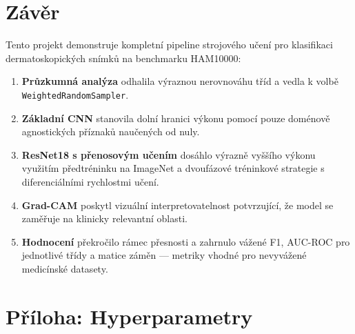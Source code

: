 \documentclass[12pt, a4paper]{article}
\begin{document}
\section{Závěr}
\label{sec:conclusion}

Tento projekt demonstruje kompletní pipeline strojového učení pro
klasifikaci dermatoskopických snímků na benchmarku HAM10000:

\begin{enumerate}
    \item \textbf{Průzkumná analýza} odhalila výraznou nerovnováhu tříd
          a vedla k volbě \texttt{WeightedRandomSampler}.
    \item \textbf{Základní CNN} stanovila dolní hranici výkonu pomocí
          pouze doménově agnostických příznaků naučených od nuly.
    \item \textbf{ResNet18 s přenosovým učením} dosáhlo výrazně vyššího
          výkonu využitím předtréninku na ImageNet a dvoufázové tréninkové
          strategie s diferenciálními rychlostmi učení.
    \item \textbf{Grad-CAM} poskytl vizuální interpretovatelnost
          potvrzující, že model se zaměřuje na klinicky relevantní oblasti.
    \item \textbf{Hodnocení} překročilo rámec přesnosti a zahrnulo vážené
          F1, AUC-ROC pro jednotlivé třídy a matice záměn --- metriky
          vhodné pro nevyvážené medicínské datasety.
\end{enumerate}

\section*{Příloha: Hyperparametry}
\label{sec:appendix}
\end{document}
